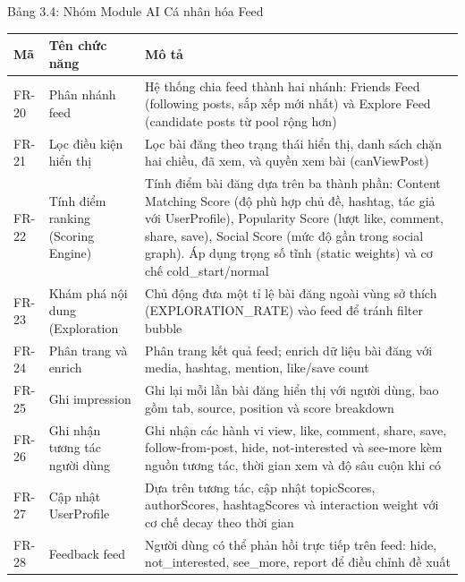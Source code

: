 Bảng 3.4: Nhóm Module AI Cá nhân hóa Feed

{\def\LTcaptype{none} %
\begin{longtable}{
  |>{\centering\arraybackslash}p{}
  |>{\centering\arraybackslash}p{}
  |>{\centering\arraybackslash}p{}|}
\endhead
\hline
\endlastfoot
Mã & Tên chức năng & Mô tả \\ \hline
FR-20 & Phân nhánh feed & Hệ thống chia feed thành hai nhánh: Friends
Feed (following posts, sắp xếp mới nhất) và Explore Feed (candidate
posts từ pool rộng hơn) \\ \hline
FR-21 & Lọc điều kiện hiển thị & Lọc bài đăng theo trạng thái hiển thị,
danh sách chặn hai chiều, đã xem, và quyền xem bài (canViewPost) \\ \hline
FR-22 & Tính điểm ranking (Scoring Engine) & Tính điểm bài đăng dựa trên
ba thành phần: Content Matching Score (độ phù hợp chủ đề, hashtag, tác
giả với UserProfile), Popularity Score (lượt like, comment, share,
save), Social Score (mức độ gần trong social graph). Áp dụng trọng số
tĩnh (static weights) và cơ chế cold\_start/normal \\ \hline
FR-23 & Khám phá nội dung (Exploration & Chủ động đưa một tỉ lệ bài đăng
ngoài vùng sở thích (EXPLORATION\_RATE) vào feed để tránh filter
bubble \\ \hline
FR-24 & Phân trang và enrich & Phân trang kết quả feed; enrich dữ liệu
bài đăng với media, hashtag, mention, like/save count \\ \hline
FR-25 & Ghi impression & Ghi lại mỗi lần bài đăng hiển thị với người
dùng, bao gồm tab, source, position và score breakdown \\ \hline
FR-26 & Ghi nhận tương tác người dùng & Ghi nhận các hành vi view, like,
comment, share, save, follow-from-post, hide, not-interested và see-more
kèm nguồn tương tác, thời gian xem và độ sâu cuộn khi có \\ \hline
FR-27 & Cập nhật UserProfile & Dựa trên tương tác, cập nhật topicScores,
authorScores, hashtagScores và interaction weight với cơ chế decay theo
thời gian \\ \hline
FR-28 & Feedback feed & Người dùng có thể phản hồi trực tiếp trên feed:
hide, not\_interested, see\_more, report để điều chỉnh đề xuất \\ \hline
\end{longtable}
}

